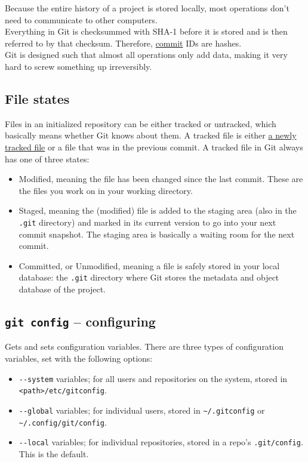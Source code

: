 \documentclass[8pt, table, xcdraw]{article}%
\begin{document}
Because the entire history of a project is stored locally, most operations don't need to communicate to other computers.\\
Everything in Git is checksummed with SHA-1 before it is stored and is then referred to by that checksum. Therefore, \hyperref[commit]{commit} IDs are hashes.\\
Git is designed such that almost all operations only add data, making it very hard to screw something up irreversibly.

\subsection{File states} \label{states}

Files in an initialized repository can be either tracked or untracked, which basically means whether Git knows about them. A tracked file is either \hyperref[add]{a newly tracked file} or a file that was in the previous commit. A tracked file in Git always has one of three states:

\begin{itemize}
    \item Modified, meaning the file has been changed since the last commit. These are the files you work on in your working directory.
    \item Staged, meaning the (modified) file is added to the staging area (also in the \lstinline{.git} directory) and marked in its current version to go into your next commit snapshot. The staging area is basically a waiting room for the next commit.
    \item Committed, or Unmodified, meaning a file is safely stored in your local database: the \lstinline{.git} directory where Git stores the metadata and object database of the project.
\end{itemize}

\subsection{\lstinline{git config} -- configuring} \label{config}

Gets and sets configuration variables. There are three types of configuration variables, set with the following options:

\begin{itemize}
    \item \lstinline{--system} variables; for all users and repositories on the system, stored in \lstinline{<path>/etc/gitconfig}.
    \item \lstinline{--global} variables; for individual users, stored in \lstinline{~/.gitconfig} or \lstinline{~/.config/git/config}.
    \item \lstinline{--local} variables; for individual repositories, stored in a repo's \lstinline{.git/config}. This is the default.
\end{itemize}
\end{document}
